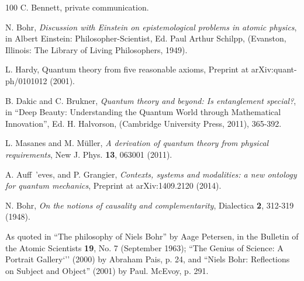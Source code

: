 \documentclass[12pt,a4]{article}
\begin{document}
\begin {thebibliography}{100}
 C. Bennett, private communication.

 N. Bohr, {\it Discussion with Einstein on epistemological problems in atomic physics}, in Albert Einstein: Philosopher-Scientist, Ed. Paul Arthur Schilpp, (Evanston, Illinois: The Library of Living Philosophers, 1949).

 L. Hardy, Quantum theory from five reasonable axioms, Preprint at arXiv:quant-ph/0101012 (2001).

 B. Dakic and C. Brukner, {\it Quantum theory and beyond: Is entanglement special?}, in ``Deep Beauty: Understanding the Quantum World through Mathematical Innovation'', Ed. H. Halvorson, (Cambridge University Press, 2011), 365-392.

 L. Masanes and M. M{\" u}ller, {\it A derivation of quantum theory from physical requirements}, New J. Phys. {\bf 13}, 063001 (2011).

 A. Auff{\ 'e}ves, and P. Grangier, {\it Contexts, systems and modalities: a new ontology for quantum mechanics}, Preprint at arXiv:1409.2120 (2014).

 N. Bohr, {\it On the notions of causality and complementarity}, Dialectica {\bf 2}, 312-319 (1948).

 As quoted in ``The philosophy of Niels Bohr'' by Aage Petersen, in the Bulletin of the Atomic Scientists {\bf 19}, No. 7 (September 1963); ``The Genius of Science: A Portrait Gallery`'' (2000) by Abraham Pais, p. 24, and ``Niels Bohr: Reflections on Subject and Object'' (2001) by Paul. McEvoy, p. 291.


\end{thebibliography}
\end{document}
